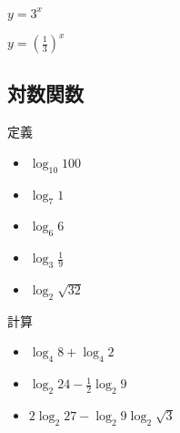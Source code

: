\documentclass[10pt,dvipdfmx]{jsarticle}
\begin{document}
\begin{table}[H]
  \begin{minipage}{0.5\linewidth}
    $y=3^x$
    \begin{center}
    \end{center}
  \end{minipage}
  \begin{minipage}{0.5\linewidth}
    $y=(\frac{1}{3})^x$
    \begin{center}
    \end{center}
  \end{minipage}
\end{table}

\subsection*{対数関数}
\begin{itembox}[l]{定義}
  \begin{multicols}{3}
    \begin{large}
      \begin{itemize}
        \item $\log_{10}100$
        \item $\log_{7}1$
        \item $\log_{6}6$
        \item $\log_{3}\frac{1}{9}$
        \item $\log_{2}\sqrt{32}$
      \end{itemize}
    \end{large}
  \end{multicols}
\end{itembox}

\begin{itembox}[l]{計算}
  \begin{multicols}{3}
    \begin{large}
      \begin{itemize}
        \item $\log_{4}8+\log_{4}2$
        \item $\log_{2}24-\frac{1}{2}\log_{2}9$
        \item $2\log_{2}27-\log_{2}9\log_{2}\sqrt{3}$
      \end{itemize}
    \end{large}
  \end{multicols}
\end{itembox}
\end{document}
